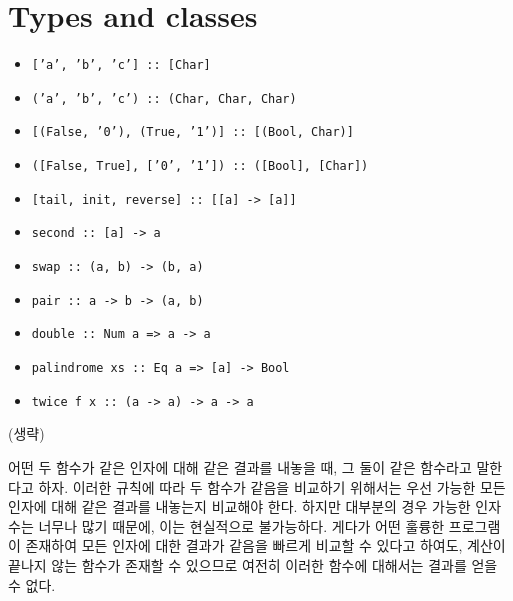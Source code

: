 \chapter{\Large{Types and classes}}


\begin{itemize}
\item \texttt{['a', 'b', 'c'] :: [Char]}
\item \texttt{('a', 'b', 'c') :: (Char, Char, Char)}
\item \texttt{[(False, '0'), (True, '1')] :: [(Bool, Char)]}
\item \texttt{([False, True], ['0', '1']) :: ([Bool], [Char])}
\item \texttt{[tail, init, reverse] :: [[a] -> [a]]}
\end{itemize}


\begin{itemize}
\item \texttt{second :: [a] -> a}
\item \texttt{swap :: (a, b) -> (b, a)}
\item \texttt{pair :: a -> b -> (a, b)}
\item \texttt{double :: Num a => a -> a}
\item \texttt{palindrome xs :: Eq a => [a] -> Bool}
\item \texttt{twice f x :: (a -> a) -> a -> a}
\end{itemize}


(생략)


어떤 두 함수가 같은 인자에 대해 같은 결과를 내놓을 때, 그 둘이 같은 함수라고
말한다고 하자. 이러한 규칙에 따라 두 함수가 같음을 비교하기 위해서는 우선
가능한 모든 인자에 대해 같은 결과를 내놓는지 비교해야 한다. 하지만 대부분의
경우 가능한 인자수는 너무나 많기 때문에, 이는 현실적으로 불가능하다. 게다가 어떤
훌륭한 프로그램이 존재하여 모든 인자에 대한 결과가
같음을 빠르게 비교할 수 있다고 하여도, 계산이 끝나지 않는 함수가 존재할 수
있으므로 여전히 이러한 함수에 대해서는 결과를 얻을 수 없다.


